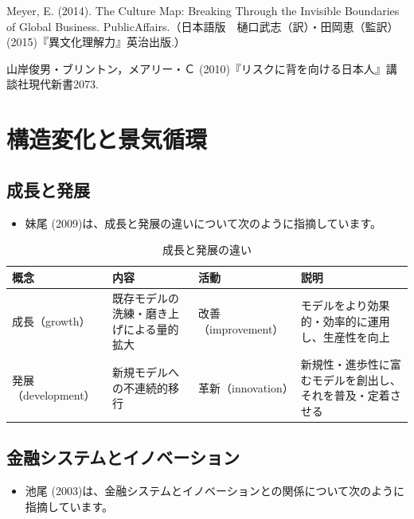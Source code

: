 \documentclass[
]{book}
\providecommand{\tightlist}{%
  \setlength{\itemsep}{0pt}\setlength{\parskip}{0pt}}
\begin{document}
Meyer, E. (2014). The Culture Map: Breaking Through the Invisible Boundaries of Global Business. PublicAffairs.（日本語版　樋口武志（訳）・田岡恵（監訳）(2015)『異文化理解力』英治出版.）

山岸俊男・ブリントン，メアリー・Ｃ (2010)『リスクに背を向ける日本人』講談社現代新書2073.

\hypertarget{change}{%
\section{構造変化と景気循環}\label{change}}

\hypertarget{ux6210ux9577ux3068ux767aux5c55}{%
\subsection{成長と発展}\label{ux6210ux9577ux3068ux767aux5c55}}

\begin{itemize}
\tightlist
\item
  妹尾 (2009)は、成長と発展の違いについて次のように指摘しています。
\end{itemize}

\begin{table}

\caption{\label{tab:senoo}成長と発展の違い}
\centering
\begin{tabular}[t]{l|l|l|l}
\hline
概念 & 内容 & 活動 & 説明\\
\hline
成長（growth） & 既存モデルの洗練・磨き上げによる量的拡大 & 改善（improvement） & モデルをより効果的・効率的に運用し、生産性を向上\\
\hline
発展（development） & 新規モデルへの不連続的移行 & 革新（innovation） & 新規性・進歩性に富むモデルを創出し、それを普及・定着させる\\
\hline
\end{tabular}
\end{table}

\hypertarget{ux91d1ux878dux30b7ux30b9ux30c6ux30e0ux3068ux30a4ux30ceux30d9ux30fcux30b7ux30e7ux30f3}{%
\subsection{金融システムとイノベーション}\label{ux91d1ux878dux30b7ux30b9ux30c6ux30e0ux3068ux30a4ux30ceux30d9ux30fcux30b7ux30e7ux30f3}}

\begin{itemize}
\tightlist
\item
  池尾 (2003)は、金融システムとイノベーションとの関係について次のように指摘しています。
\end{itemize}
\end{document}
